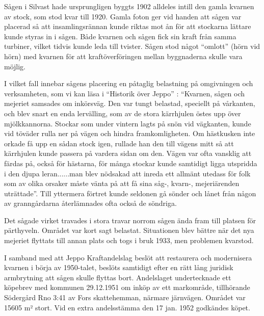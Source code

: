 
\jhnooccupant{}

Sågen i Silvast hade ursprungligen byggts 1902 alldeles intill den gamla kvarnen av stock, som stod kvar till 1920. Gamla foton ger vid handen att sågen var placerad så att insamlingsrännan kunde riktas mot ån för att stockarna lättare kunde styras in i sågen. Både kvarnen och sågen fick sin kraft från samma turbiner, vilket tidvis kunde leda till tvister. Sågen stod något ``omlott'' (hörn vid hörn) med kvarnen för att kraftöverföringen mellan byggnaderna skulle vara möjlig.

I vilket fall innebar sågens placering en påtaglig belastning på omgivningen och verksamheten, som vi kan läsa i ``Historik över Jeppo'' : ``Kvarnen, sågen och mejeriet samsades om inkörsväg. Den var tungt belastad, speciellt på vårkanten, och blev snart en enda lervälling, som av de stora kärrhjulen östes upp över mjölkkannorna. Stockar som under vintern lagts på snön vid vägkanten, kunde vid töväder rulla ner på vägen och hindra framkomligheten. Om hästkusken inte orkade få upp en sådan stock igen, rullade han den till vägens mitt så att kärrhjulen kunde passera på vardera sidan om den. Vägen var ofta vansklig att färdas på, också för hästarna, för många stockar kunde samtidigt ligga utspridda i den djupa leran......man blev nödsakad att inreda ett allmänt utedass för folk som av olika orsaker måste vänta på att få sina såg-, kvarn-, mejeriärenden uträttade''. Till yttermera förtret kunde seldonen gå sönder och lånet från någon av granngårdarna återlämnades ofta också de söndriga.

Det sågade virket travades i stora travar norrom sågen ända fram till platsen för pärthyveln. Området var kort sagt belastat. Situationen blev bättre när det nya mejeriet flyttats till annan plats och togs i bruk 1933, men problemen kvarstod.

I samband med att Jeppo Kraftandelslag beslöt att restaurera och modernisera kvarnen i börja av 1950-talet, beslöts samtidigt efter en rätt lång juridisk armbrytning att sågen skulle flyttas bort. Andelslaget undertecknade ett köpebrev med kommunen 29.12.1951 om inköp av ett markområde, tillhörande Södergård Rno 3:41 av Fors skattehemman, närmare järnvägen. Området var 15605 m² stort. Vid en extra andelsstämma den 17 jan. 1952 godkändes köpet.


